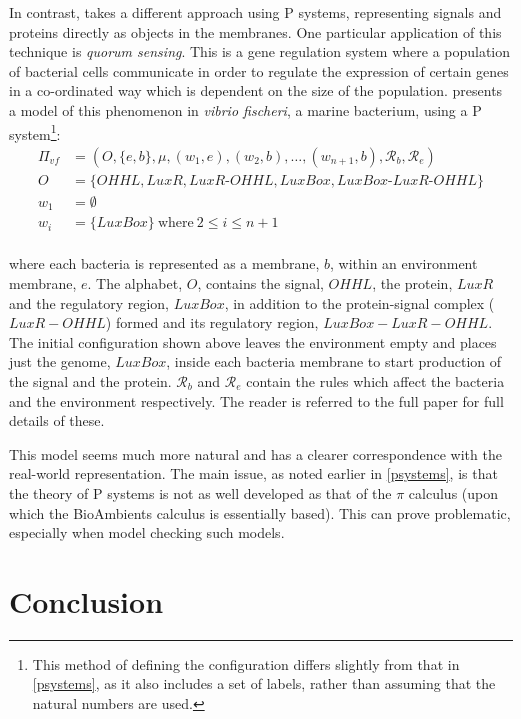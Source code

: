 In contrast, \cite{fran} takes a different approach using P systems,
representing signals and proteins directly as objects in the membranes.
One particular application of this technique is \emph{quorum sensing}.
This is a gene regulation system where a population of bacterial cells
communicate in order to regulate the expression of certain genes in a
co-ordinated way which is dependent on the size of the population.
\cite{fran} presents a model of this phenomenon in \emph{vibrio
fischeri}, a marine bacterium, using a P system\footnote{This method of
defining the configuration differs slightly from that in \ref{psystems},
as it also includes a set of labels, rather than assuming that the
natural numbers are used.}:
\begin{align*}
  \Pi_{vf} & = (O, \{e,b\}, \mu, (w_1, e), (w_2, b), \dots,
  (w_{n+1},b),\mathcal{R}_b, \mathcal{R}_e) \\
  O & = \{OHHL, LuxR, LuxR\text{-}OHHL, LuxBox, LuxBox\text{-}LuxR\text{-}OHHL\} \\
  w_1 & = \emptyset \\
  w_i & = \{LuxBox\}\ \text{where}\ 2 \le i \le n + 1 \\
\end{align*}

\noindent where each bacteria is represented as a membrane, $b$, within
an environment membrane, $e$.  The alphabet, $O$, contains the signal,
$OHHL$, the protein, $LuxR$ and the regulatory region, $LuxBox$, in
addition to the protein-signal complex ($LuxR-OHHL$) formed and its
regulatory region, $LuxBox-LuxR-OHHL$.  The initial configuration shown
above leaves the environment empty and places just the genome, $LuxBox$,
inside each bacteria membrane to start production of the signal and the
protein.  $\mathcal{R}_b$ and $\mathcal{R}_e$ contain the rules which
affect the bacteria and the environment respectively.  The reader is
referred to the full paper for full details of these.

This model seems much more natural and has a clearer correspondence with
the real-world representation.  The main issue, as noted earlier in
\ref{psystems}, is that the theory of P systems is not as well developed
as that of the $\pi$ calculus (upon which the BioAmbients calculus is
essentially based).  This can prove problematic, especially when model
checking such models.

\section{Conclusion}

